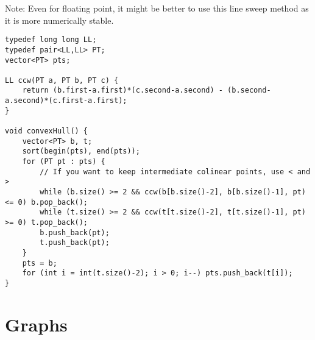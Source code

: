 \documentclass[letterpaper]{article}
\begin{document}
Note: Even for floating point, it might be better to use this line sweep method as it is more numerically stable.

\begin{lstlisting}
typedef long long LL;
typedef pair<LL,LL> PT;
vector<PT> pts;

LL ccw(PT a, PT b, PT c) {
	return (b.first-a.first)*(c.second-a.second) - (b.second-a.second)*(c.first-a.first);
}

void convexHull() {
	vector<PT> b, t;
	sort(begin(pts), end(pts));
	for (PT pt : pts) {
		// If you want to keep intermediate colinear points, use < and >
		while (b.size() >= 2 && ccw(b[b.size()-2], b[b.size()-1], pt) <= 0) b.pop_back();
		while (t.size() >= 2 && ccw(t[t.size()-2], t[t.size()-1], pt) >= 0) t.pop_back();
		b.push_back(pt);
		t.push_back(pt);
	}
	pts = b;
	for (int i = int(t.size()-2); i > 0; i--) pts.push_back(t[i]);
}
\end{lstlisting}

\section{Graphs}
\end{document}
